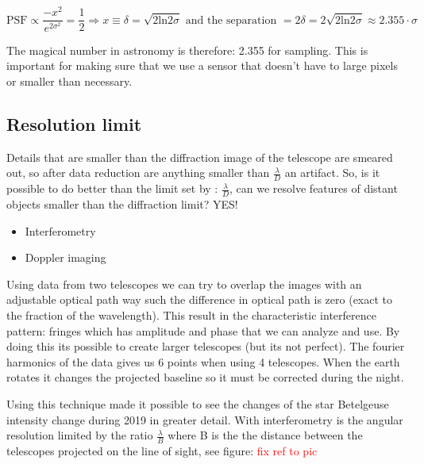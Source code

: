 		 \begin{equation}
		 	\text{PSF} \propto \frac{-x^2} {e^{2\sigma^2}} = \frac{1} {2} \Rightarrow x  \equiv \delta = \sqrt{2 \text{ln}2\sigma} \text{ and the separation } = 2\delta= 2  \sqrt{2 \text{ln}2\sigma} \approx 2.355 \cdot \sigma 
		 \end{equation}

	The magical number in astronomy is therefore: 2.355 for sampling. This is important for making sure that we use a sensor that doesn't have to large pixels or smaller than necessary. 

	\subsection*{Resolution limit}
	Details that are smaller than the diffraction image of the telescope are smeared out, so after data reduction are anything smaller than $\frac{\lambda} {D} $ an artifact. So, is it possible to do better than the limit set by : $\frac{\lambda} {D} $, can we resolve features of distant objects smaller than the diffraction limit? YES!

		\begin{itemize}
		  	\item Interferometry 
		  	\item Doppler imaging
		  \end{itemize}  
	
	Using data from two telescopes we can try to overlap the images with an adjustable optical path way such the difference in optical path is zero (exact to the fraction of the wavelength). This result in the characteristic interference pattern: fringes which has amplitude and phase that we can analyze and use. By doing this its possible to create larger telescopes (but its not perfect). The fourier harmonics of the data gives us 6 points when using 4 telescopes. When the earth rotates it changes the projected baseline so it must be corrected during the night. 

	Using this technique made it possible to see the changes of the star Betelgeuse intensity change during 2019 in greater detail. With interferometry is the angular resolution limited by the ratio $\frac{\lambda} {B} $ where B is the the distance between the telescopes projected on the line of sight, see figure: \textcolor{red}{fix ref to pic} 	 

